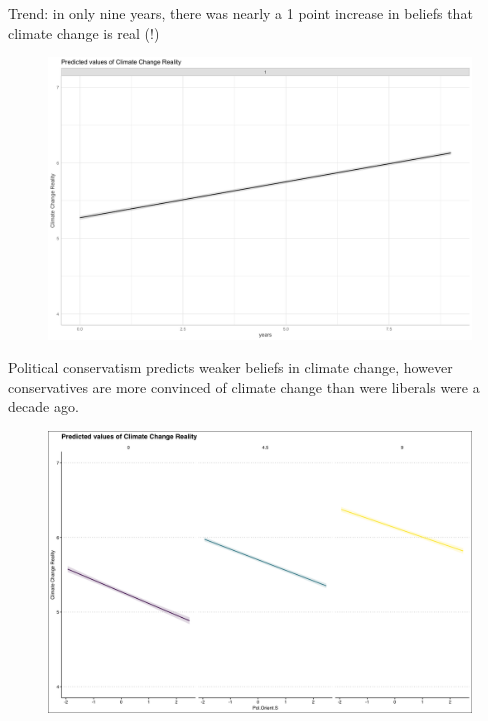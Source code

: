 \documentclass{beamer}
\begin{document}
\begin{frame}{Trend: in only nine years, there was nearly a 1 point increase in beliefs that climate change is real (!)}
\begin{figure}
\includegraphics[width=.8\textwidth,height=\textheight,keepaspectratio]{Figures/REAL_TIME.png}
\end{figure}
\end{frame}
% 
% 
% 
% 

\begin{frame}{Political conservatism predicts weaker beliefs in climate change, however conservatives are more convinced of climate change than were liberals were a decade ago.}
\begin{figure}
\includegraphics[width=.8\textwidth,height=\textheight,keepaspectratio]{Figures/REAL_Pol.Orient.S.png}
\end{figure}
\end{frame}
\end{document}
